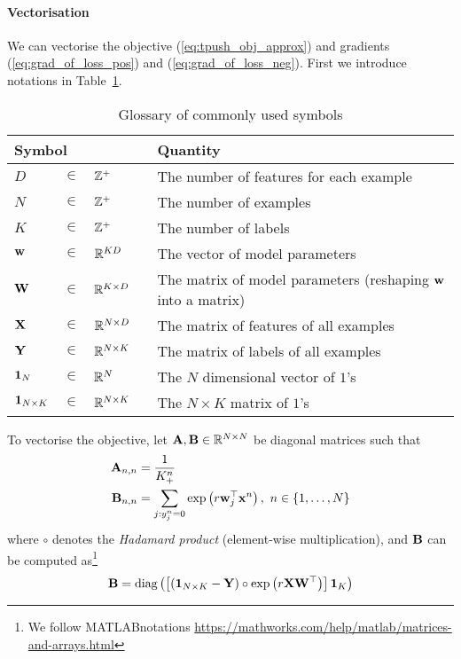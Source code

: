 \paragraph{Vectorisation}
We can vectorise the objective (\ref{eq:tpush_obj_approx}) and gradients (\ref{eq:grad_of_loss_pos}) and (\ref{eq:grad_of_loss_neg}).
First we introduce notations in Table~\ref{tab:symbol_tpush}.
\begin{table}[!h]
\caption{Glossary of commonly used symbols}
\label{tab:symbol_tpush}
\renewcommand{\arraystretch}{1.5} %
\setlength{\tabcolsep}{1pt} %
\centering
\begin{tabular}{llll}
\hline \hline
\multicolumn{3}{l}{\textbf{Symbol}} & \textbf{Quantity} \\ \hline 
$D$        &  $\in$  &  $\mathbb{Z}^+$            & The number of features for each example \\
$N$        &  $\in$  &  $\mathbb{Z}^+$            & The number of examples \\
$K$        &  $\in$  &  $\mathbb{Z}^+$            & The number of labels \\
$\mathbf{w}$       &  $\in$  &  $\mathbb{R}^{K D}$        & The vector of model parameters \\
$\mathbf{W}$       &  $\in$  &  $\mathbb{R}^{K \times D}$ & The matrix of model parameters (reshaping $\mathbf{w}$ into a matrix) \\
$\mathbf{X}$       &  $\in$  &  $\mathbb{R}^{N \times D}$ & The matrix of features of all examples \\
$\mathbf{Y}$       &  $\in$  &  $\mathbb{R}^{N \times K}$ & The matrix of labels of all examples \\
$\mathbf{1}_N$   &  $\in$  &  $\mathbb{R}^N$            & The $N$ dimensional vector of $1$'s \\
$\mathbf{1}_{N \times K}$  &  $\in$  &  $\mathbb{R}^{N \times K} \quad$  & The $N \times K$ matrix of $1$'s \\ \hline
\end{tabular}
\end{table}

To vectorise the objective, 
let $\mathbf{A}, \mathbf{B} \in \mathbb{R}^{N \times N}$ be diagonal matrices such that 
\begin{align*}
\mathbf{A}_{n,n} &= \frac{1}{K_+^n} \\
\mathbf{B}_{n,n} &= \underset{j:y_j^n=0}{\sum} \exp\left( r \mathbf{w}_j^\top \mathbf{x}^n \right), \ n \in \{1,\dots,N\}
\end{align*}
where $\circ$ denotes the \emph{Hadamard product} (\ie element-wise multiplication), and
$\mathbf{B}$ can be computed as\footnote{We follow MATLAB\textsuperscript{\textregistered}notations \url{https://mathworks.com/help/matlab/matrices-and-arrays.html}}
$$
\mathbf{B} = \text{diag} \left( \left[ \left( \mathbf{1}_{N \times K} - \mathbf{Y} \right) \circ \exp \left( r \mathbf{X} \mathbf{W}^\top \right) \right] \mathbf{1}_K \right)
$$

